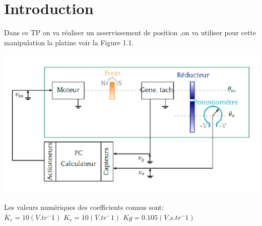 \chapter*{Introduction}Dans ce TP on va réaliser un asservissement de position ,on va utiliser pour cette manipulation la platine voir   la Figure 1.1.

\begin{center}
\includegraphics[scale=0.5]{fiiig1.png}
\label{fig1} 
\end{center}

Les valeurs numériques des coefficients connus sont:\\

 $K_e=10(V.tr^-1)$	 \hfill		$K_s=10(V.tr^-1)$	\hfill		$Kg=0.105(V.s.tr^-1)$ 